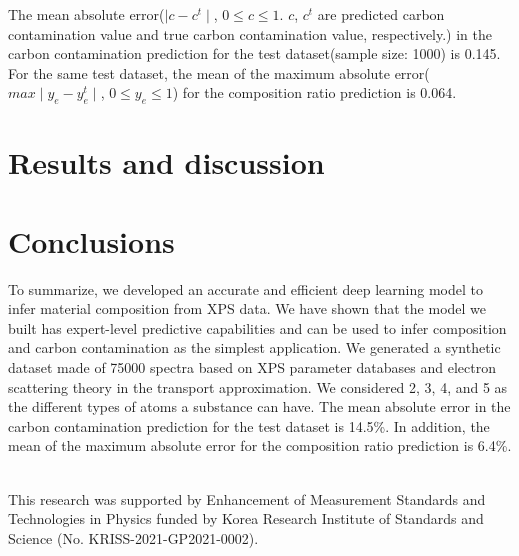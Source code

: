 \documentclass[preprint,aps,floatfix,showpacs]{revtex4-2}
\begin{document}
 
The mean absolute error($\mid c-c^t \mid$, $0\le c \le1$. $c$, $c^t$ are predicted carbon contamination value and true carbon contamination value, respectively.) in the carbon contamination prediction for the test dataset(sample size: 1000) is 0.145. 
For the same test dataset, the mean of the maximum absolute error($max\mid y_e-y^t_e\mid$, $0 \le y_e \le 1$) for the composition ratio prediction is 0.064.

\section{Results and discussion} \label{results}


\section{Conclusions}	\label{conclusions}
To summarize, we developed an accurate and efficient deep learning model to infer material composition from XPS data.  We have shown that the model we built has expert-level predictive capabilities and can be used to infer  composition and carbon contamination as the simplest application. 
We generated a synthetic dataset made of 75000 spectra based on XPS parameter databases and electron scattering theory in the transport approximation.  We considered 2, 3, 4, and 5 as the different types of atoms a substance can have.
The mean absolute error in the carbon contamination prediction for the test dataset is 14.5\%. 
In addition, the mean of the maximum absolute error for the composition ratio prediction is 6.4\%.	
	
~\\
This research was supported by Enhancement of Measurement
Standards and Technologies in Physics funded by Korea Research
Institute of Standards and Science (No. KRISS-2021-GP2021-0002).



\newpage
\end{document}
